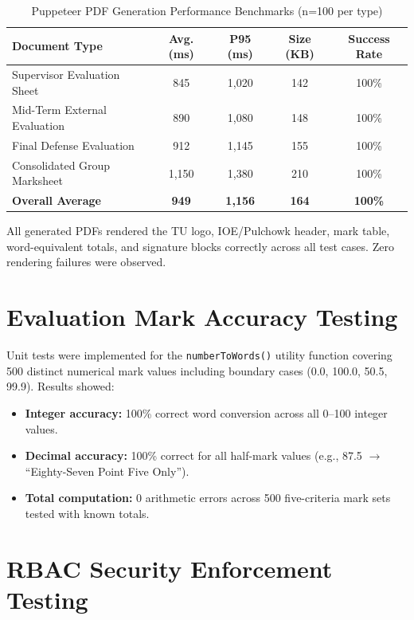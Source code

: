 \documentclass[12pt]{report}
\begin{document}
\begin{table}[H]
\centering
\caption{Puppeteer PDF Generation Performance Benchmarks (n=100 per type)}\label{tab:pdf_perf}
\begin{tabular}{l c c c c}
\toprule
\textbf{Document Type} & \textbf{Avg. (ms)} & \textbf{P95 (ms)} & \textbf{Size (KB)} & \textbf{Success Rate}\\
\midrule
Supervisor Evaluation Sheet   & 845  & 1,020  & 142 & 100\%\\
Mid-Term External Evaluation  & 890  & 1,080  & 148 & 100\%\\
Final Defense Evaluation      & 912  & 1,145  & 155 & 100\%\\
Consolidated Group Marksheet  & 1,150 & 1,380 & 210 & 100\%\\
\midrule
\textbf{Overall Average}      & \textbf{949} & \textbf{1,156} & \textbf{164} & \textbf{100\%}\\
\bottomrule
\end{tabular}
\end{table}

All generated PDFs rendered the TU logo, IOE/Pulchowk header, mark table, word-equivalent totals, and signature blocks correctly across all test cases. Zero rendering failures were observed.

\section{Evaluation Mark Accuracy Testing}

Unit tests were implemented for the \texttt{numberToWords()} utility function covering 500 distinct numerical mark values including boundary cases (0.0, 100.0, 50.5, 99.9). Results showed:

\begin{itemize}[leftmargin=*]
  \item \textbf{Integer accuracy:} 100\% correct word conversion across all 0--100 integer values.
  \item \textbf{Decimal accuracy:} 100\% correct for all half-mark values (e.g., 87.5 $\rightarrow$ ``Eighty-Seven Point Five Only'').
  \item \textbf{Total computation:} 0 arithmetic errors across 500 five-criteria mark sets tested with known totals.
\end{itemize}

\section{RBAC Security Enforcement Testing}
\end{document}
